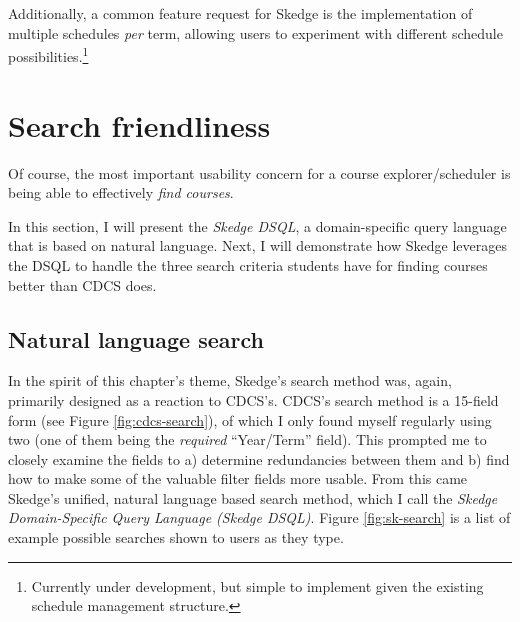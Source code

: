 Additionally, a common feature request for Skedge is the implementation of multiple schedules \emph{per} term, allowing users to experiment with different schedule possibilities.\footnote{Currently under development, but simple to implement given the existing schedule management structure.}

\section{Search friendliness}

Of course, the most important usability concern for a course explorer/scheduler is being able to effectively \emph{find courses}.

In this section, I will present the \emph{Skedge DSQL}, a domain-specific query language that is based on natural language. Next, I will demonstrate how Skedge leverages the DSQL to handle the three search criteria students have for finding courses better than CDCS does.

\subsection{Natural language search}

In the spirit of this chapter's theme, Skedge's search method was, again, primarily designed as a reaction to CDCS's. CDCS's search method is a 15-field form (see Figure \ref{fig:cdcs-search}), of which I only found myself regularly using two (one of them being the \emph{required} ``Year/Term'' field). This prompted me to closely examine the fields to a) determine redundancies between them and b) find how to make some of the valuable filter fields more usable. From this came Skedge's unified, natural language based search method, which I call the \emph{Skedge Domain-Specific Query Language (Skedge DSQL)}. Figure \ref{fig:sk-search} is a list of example possible searches shown to users as they type.

